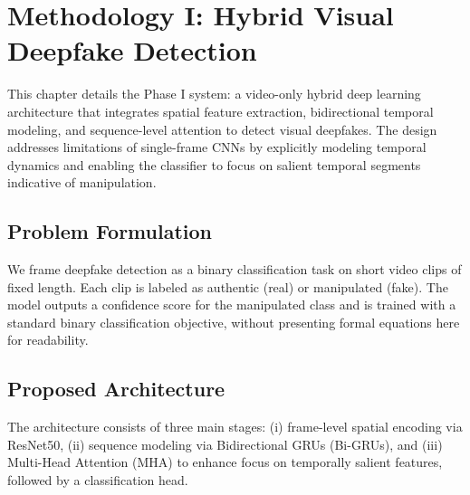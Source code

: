 \chapter{Methodology I: Hybrid Visual Deepfake Detection}
\label{ch:method-visual}

This chapter details the Phase I system: a video-only hybrid deep learning architecture that integrates spatial feature extraction, bidirectional temporal modeling, and sequence-level attention to detect visual deepfakes. The design addresses limitations of single-frame CNNs by explicitly modeling temporal dynamics and enabling the classifier to focus on salient temporal segments indicative of manipulation.

\section{Problem Formulation}
We frame deepfake detection as a binary classification task on short video clips of fixed length. Each clip is labeled as authentic (real) or manipulated (fake). The model outputs a confidence score for the manipulated class and is trained with a standard binary classification objective, without presenting formal equations here for readability.

\section{Proposed Architecture}
The architecture consists of three main stages: (i) frame-level spatial encoding via ResNet50, (ii) sequence modeling via Bidirectional GRUs (Bi-GRUs), and (iii) Multi-Head Attention (MHA) to enhance focus on temporally salient features, followed by a classification head.

